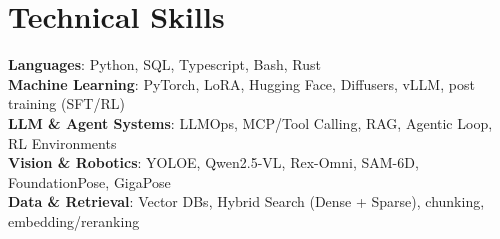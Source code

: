 \documentclass[letterpaper,11pt]{article}
\begin{document}
\section{Technical Skills}
\begin{itemize}[leftmargin=0.15in, label={}]
  \small{\item{
        \textbf{Languages}{: Python, SQL, Typescript, Bash, Rust} \\
        \textbf{Machine Learning}{: PyTorch, LoRA, Hugging Face, Diffusers, vLLM, post training (SFT/RL)} \\
        \textbf{LLM \& Agent Systems}{: LLMOps, MCP/Tool Calling, RAG, Agentic Loop, RL Environments} \\
        \textbf{Vision \& Robotics}{: YOLOE, Qwen2.5-VL, Rex-Omni, SAM-6D, FoundationPose, GigaPose} \\
        \textbf{Data \& Retrieval}{: Vector DBs, Hybrid Search (Dense + Sparse), chunking, embedding/reranking}
        }}
\end{itemize}

\end{document}
